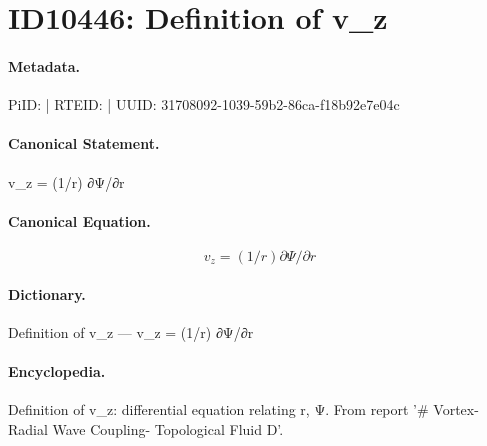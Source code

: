 \section*{ID10446: Definition of v\_z}
\paragraph{Metadata.}
PiID:  | RTEID:  | UUID: 31708092-1039-59b2-86ca-f18b92e7e04c

\paragraph{Canonical Statement.}
v\_z = (1/r) ∂Ψ/∂r

\paragraph{Canonical Equation.}
\[
v_z = (1/r) ∂Ψ/∂r
\]

\paragraph{Dictionary.}
Definition of v\_z — v\_z = (1/r) ∂Ψ/∂r

\paragraph{Encyclopedia.}
Definition of v\_z: differential equation relating r, Ψ. From report '\# Vortex-Radial Wave Coupling- Topological Fluid D'.
